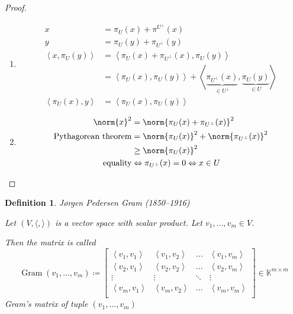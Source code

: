 \documentclass[a4paper,landscape,twocolumn]{article}
\newcommand\functional[1]{\left\langle{#1}\right\rangle}
\newtheorem{defi}{Definition}
\DeclarePairedDelimiter\norm\lVert\rVert
\begin{document}
\begin{proof}
  \begin{enumerate}
    \item
      \begin{align*}
        x &= \pi_U(x) + \pi^{U^\bot}(x) \\
        y &= \pi_U(y) + \pi_{U^\bot}(y) \\
        \functional{x, \pi_U(y)} &= \functional{\pi_U(x) + \pi_{U^{\bot}}(x), \pi_U(y)} \\
          &= \functional{\pi_U(x), \pi_U(y)} + \functional{\underbrace{\pi_{U^\bot}(x)}_{\in U^\bot}, \underbrace{\pi_U(y)}_{\in U}} \\
        \functional{\pi_U(x), y} &= \functional{\pi_U(x), \pi_U(y)}
      \end{align*}
    \item
      \begin{align*}
        \norm{x}^2 &= \norm{\pi_U(x) + \pi_{U^\bot}(x)}^2 \\
        \text{Pythagorean theorem} &= \norm{\pi_U(x)}^2 + \norm{\pi_{U^\bot}(x)}^2 \\
          &\geq \norm{\pi_U(x)}^2 \\
        \text{equality} &\Leftrightarrow \pi_{U^\bot}(x) = 0 \Leftrightarrow x \in U
      \end{align*}
  \end{enumerate}
\end{proof}

\begin{defi}
  \label{defi-8.51}
  J\o rgen Pedersen Gram (1850--1916)

  Let $(V, \langle, \rangle)$ is a vector space with scalar product.
  Let $v_1, \ldots, v_m \in V$.

  Then the matrix is called
  \[
    \operatorname{Gram}(v_1, \ldots, v_m)
    \coloneqq \begin{bmatrix}
      \functional{v_1, v_1} & \functional{v_1, v_2} & \ldots & \functional{v_1, v_m} \\
      \functional{v_2, v_1} & \functional{v_2, v_2} & \ldots & \functional{v_2, v_m} \\
      \vdots & \vdots & \ddots & \vdots \\
      \functional{v_m, v_1} & \functional{v_m, v_2} & \ldots & \functional{v_m, v_m} \\
    \end{bmatrix}
    \in \mathbb K^{m \times m}
  \]
  \emph{Gram's matrix of tuple} $(v_1, \ldots, v_m)$
\end{defi}
\end{document}
